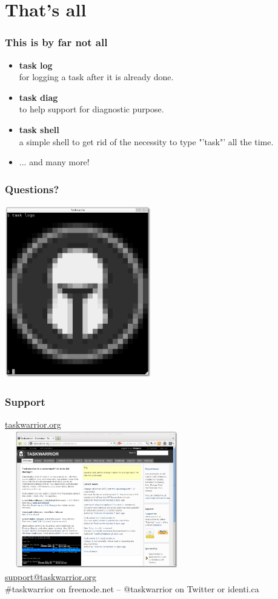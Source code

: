 \documentclass[t,handout]{beamer}
\begin{document}
\section{That's all}

\begin{frame}
\frametitle{This is by far not all}
\begin{itemize}
\item \textbf{task log}  \\
for logging a task after it is already done.
\item \textbf{task diag} \\
to help support for diagnostic purpose.
\item \textbf{task shell} \\
a simple shell to get rid of the necessity to type "'task"' all the time.
\item ... and many more!
\end{itemize}
\end{frame}

\begin{frame}
\frametitle{Questions?}
\begin{center}
\includegraphics[width=6.4cm,height=7.5cm]{task_logo.png}
\end{center}
\end{frame}

\begin{frame}
\frametitle{Support}
\begin{center}
\href{http://taskwarrior.org/}{taskwarrior.org \\ \includegraphics[width=8cm,height=6cm]{website.png}} \\
\href{mailto:support@taskwarrior.org}{support@taskwarrior.org} \\
\#taskwarrior on freenode.net -- @taskwarrior on Twitter or identi.ca
\end{center}
\end{frame}
\end{document}
